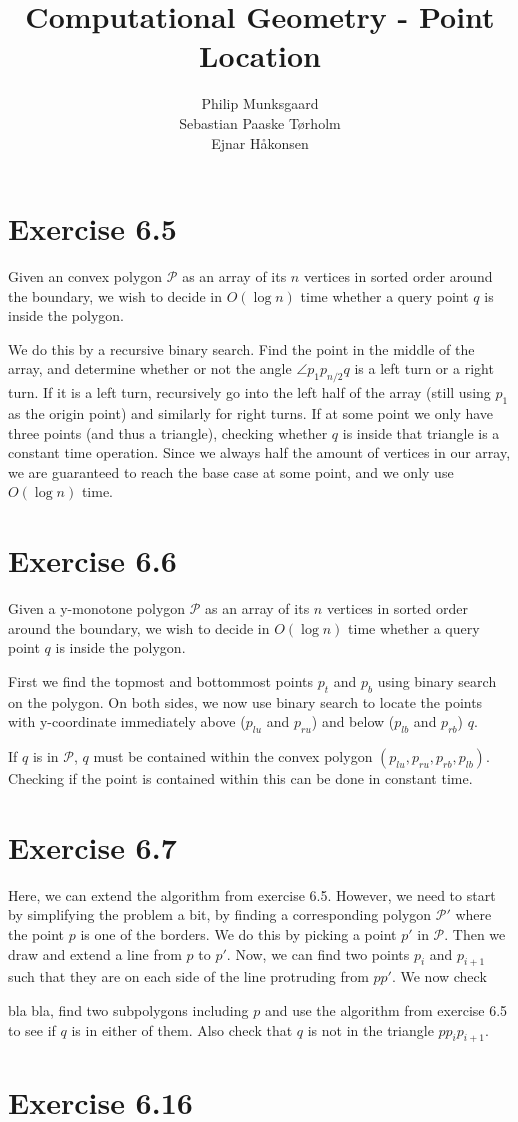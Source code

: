 \documentclass[11pt,a4paper]{article}
\title{Computational Geometry - Point Location}
\author{Philip Munksgaard \\ Sebastian Paaske Tørholm \\ Ejnar Håkonsen}
\begin{document}
\maketitle

\section{Exercise 6.5}

Given an convex polygon $\mathcal{P}$ as an array of its $n$ vertices
in sorted order around the boundary, we wish to decide in $O(\log n)$
time whether a query point $q$ is inside the polygon.

We do this by a recursive binary search. Find the point in the middle
of the array, and determine whether or not the angle $\angle p_1
p_{n/2} q$ is a left turn or a right turn. If it is a left turn,
recursively go into the left half of the array (still using $p_1$ as
the origin point) and similarly for right turns. If at some point we
only have three points (and thus a triangle), checking whether $q$ is
inside that triangle is a constant time operation. Since we always
half the amount of vertices in our array, we are guaranteed to reach
the base case at some point, and we only use $O(\log n)$ time.

\section{Exercise 6.6}
Given a y-monotone polygon $\mathcal{P}$ as an array of its $n$ vertices
in sorted order around the boundary, we wish to decide in $O(\log n)$
time whether a query point $q$ is inside the polygon.

First we find the topmost and bottommost points $p_t$ and $p_b$ using binary
search on the polygon. On both sides, we now use binary search to locate the
points with y-coordinate immediately above ($p_{lu}$ and $p_{ru}$) and below
($p_{lb}$ and $p_{rb}$) $q$.

If $q$ is in $\mathcal{P}$, $q$ must be contained within the convex polygon
$(p_{lu}, p_{ru}, p_{rb}, p_{lb})$. Checking if the point is contained
within this can be done in constant time.

\section{Exercise 6.7}

Here, we can extend the algorithm from exercise 6.5. However, we
need to start by simplifying the problem a bit, by finding a
corresponding polygon $\mathcal{P}'$ where the point $p$ is one of the
borders. We do this by picking a point $p'$ in $\mathcal{P}$. Then we
draw and extend a line from $p$ to $p'$. Now, we can find two points
$p_i$ and $p_{i+1}$ such that they are on each side of the line
protruding from $pp'$. We now check

bla bla, find two subpolygons including $p$ and use the algorithm from
exercise 6.5 to see if $q$ is in either of them. Also check that $q$
is not in the triangle $pp_ip_{i+1}$.

\section{Exercise 6.16}
\end{document}
